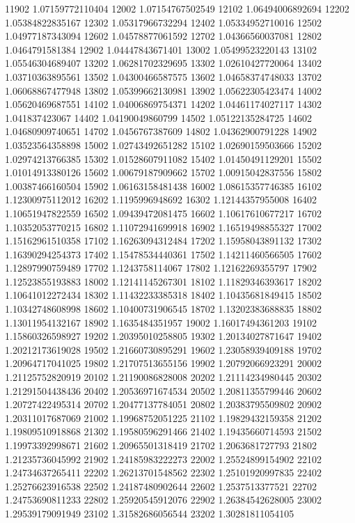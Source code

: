 {11902 1.07159772110404
12002 1.07154767502549
12102 1.06494006892694
12202 1.05384822835167
12302 1.05317966732294
12402 1.05334952710016
12502 1.04977187343094
12602 1.04578877061592
12702 1.04366560037081
12802 1.0464791581384
12902 1.04447843671401
13002 1.05499523220143
13102 1.05546304689407
13202 1.06281702329695
13302 1.02610427720064
13402 1.03710363895561
13502 1.04300466587575
13602 1.04658374748033
13702 1.06068867477948
13802 1.05399662130981
13902 1.05622305423474
14002 1.05620469687551
14102 1.04006869754371
14202 1.04461174027117
14302 1.041837423067
14402 1.04190049860799
14502 1.05122135284725
14602 1.04680909740651
14702 1.0456767387609
14802 1.04362900791228
14902 1.03523564358898
15002 1.02743492651282
15102 1.02690159503666
15202 1.02974213766385
15302 1.01528607911082
15402 1.01450491129201
15502 1.01014913380126
15602 1.00679187909662
15702 1.00915042837556
15802 1.00387466160504
15902 1.06163158481438
16002 1.08615357746385
16102 1.12300975112012
16202 1.1195996948692
16302 1.12144357955008
16402 1.10651947822559
16502 1.09439472081475
16602 1.10617610677217
16702 1.10352053770215
16802 1.11072941699918
16902 1.16519498855327
17002 1.15162961510358
17102 1.16263094312484
17202 1.15958043891132
17302 1.16390294254373
17402 1.15478534440361
17502 1.14211460566505
17602 1.12897990759489
17702 1.1243758114067
17802 1.12162269355797
17902 1.12523855193883
18002 1.12141145267301
18102 1.11829346393617
18202 1.10641012272434
18302 1.11432233385318
18402 1.10435681849415
18502 1.10342748608998
18602 1.10400731906545
18702 1.13202383688835
18802 1.13011954132167
18902 1.1635484351957
19002 1.16017494361203
19102 1.15860326598927
19202 1.20395010258805
19302 1.20134027871647
19402 1.20212173619028
19502 1.21660730895291
19602 1.23058939409188
19702 1.20964717041025
19802 1.21707513655156
19902 1.20792066923291
20002 1.21125752820919
20102 1.21190086828008
20202 1.21114234980445
20302 1.21291504438436
20402 1.20536971674534
20502 1.20811355799446
20602 1.20727422495314
20702 1.20477137784051
20802 1.20383795509802
20902 1.20311017687069
21002 1.19968752051225
21102 1.19829432159358
21202 1.19809510918868
21302 1.19580596291466
21402 1.19435660714593
21502 1.19973392998671
21602 1.20965501318419
21702 1.2063681727793
21802 1.21235736045992
21902 1.24185983222273
22002 1.25524899154902
22102 1.24734637265411
22202 1.26213701548562
22302 1.25101920997835
22402 1.25276623916538
22502 1.24187480902644
22602 1.2537513377521
22702 1.24753690811233
22802 1.25920545912076
22902 1.26384542628005
23002 1.29539179091949
23102 1.31582686056544
23202 1.30281811054105
}
